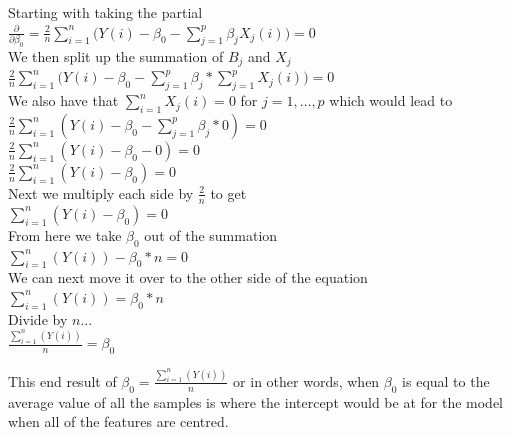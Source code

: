\documentclass[12pt]{article}
\begin{document}
\begin{center}
    Starting with taking the partial\\
    $\frac{\partial}{\partial\beta_0} = \frac{2}{n}\sum_{i = 1}^{n} \bigg( Y(i) - \beta_0 - \sum_{j=1}^p\beta_jX_j(i)\bigg) = 0$\\
    We then split up the summation of $B_j$ and $X_j$\\
    $\frac{2}{n}\sum_{i = 1}^{n} \bigg( Y(i) - \beta_0 - \sum_{j=1}^p\beta_j * \sum_{j=1}^pX_j(i)\bigg) = 0$\\
    We also have that $\sum_{i=1}^nX_j(i) = 0$ for $ j = 1, \dots, p$ which would lead to\\
    $\frac{2}{n}\sum_{i = 1}^{n} ( Y(i) - \beta_0 - \sum_{j=1}^p\beta_j * 0) = 0$\\
    $\frac{2}{n}\sum_{i = 1}^{n} ( Y(i) - \beta_0 - 0) = 0$\\
    $\frac{2}{n}\sum_{i = 1}^{n} (Y(i) - \beta_0) = 0$\\
    Next we multiply each side by $\frac{2}{n}$ to get\\
    $\sum_{i = 1}^{n} (Y(i) - \beta_0) = 0$\\
    From here we take $\beta_0$ out of the summation\\
    $\sum_{i = 1}^{n} (Y(i)) - \beta_0 * n = 0$\\
    We can next move it over to the other side of the equation\\
    $\sum_{i = 1}^{n} (Y(i)) = \beta_0 * n $\\
    Divide by $n$...\\
    $\frac{\sum_{i = 1}^{n} (Y(i))}{n} = \beta_0$
\end{center}
This end result of $\beta_0 = \frac{\sum_{i = 1}^{n} (Y(i))}{n}$ or in other words, when $\beta_0$ is equal to the average value of all the samples is where the intercept would be at for the model when all of the features are centred.
\end{document}
